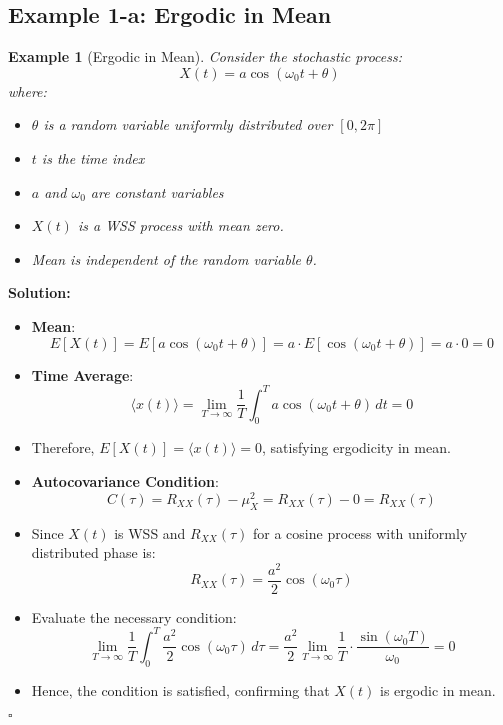 \documentclass[12pt]{article}
\newtheorem{example}{Example}
\newenvironment{solution}{\noindent\textbf{Solution:}}{\hfill$\square$}
\begin{document}
\subsection{Example 1-a: Ergodic in Mean}
\begin{example}[Ergodic in Mean]
Consider the stochastic process:
\[
X(t) = a \cos(\omega_0 t + \theta)
\]
where:
\begin{itemize}
    \item \( \theta \) is a random variable uniformly distributed over \( [0, 2\pi] \)
    \item \( t \) is the time index
    \item \( a \) and \( \omega_0 \) are constant variables
\end{itemize}
\begin{itemize}
    \item \( X(t) \) is a WSS process with mean zero.
    \item Mean is independent of the random variable \( \theta \).
\end{itemize}
\end{example}
\begin{solution}
\begin{itemize}
    \item \textbf{Mean}:
    \[
    E[X(t)] = E[a \cos(\omega_0 t + \theta)] = a \cdot E[\cos(\omega_0 t + \theta)] = a \cdot 0 = 0
    \]
    \item \textbf{Time Average}:
    \[
    \langle x(t) \rangle = \lim_{T \to \infty} \frac{1}{T} \int_{0}^{T} a \cos(\omega_0 t + \theta) \, dt = 0
    \]
    \item Therefore, \( E[X(t)] = \langle x(t) \rangle = 0 \), satisfying ergodicity in mean.
    \item \textbf{Autocovariance Condition}:
    \[
    C(\tau) = R_{XX}(\tau) - \mu_X^2 = R_{XX}(\tau) - 0 = R_{XX}(\tau)
    \]
    \item Since \( X(t) \) is WSS and \( R_{XX}(\tau) \) for a cosine process with uniformly distributed phase is:
    \[
    R_{XX}(\tau) = \frac{a^2}{2} \cos(\omega_0 \tau)
    \]
    \item Evaluate the necessary condition:
    \[
    \lim_{T \to \infty} \frac{1}{T} \int_{0}^{T} \frac{a^2}{2} \cos(\omega_0 \tau) \, d\tau = \frac{a^2}{2} \lim_{T \to \infty} \frac{1}{T} \cdot \frac{\sin(\omega_0 T)}{\omega_0} = 0
    \]
    \item Hence, the condition is satisfied, confirming that \( X(t) \) is ergodic in mean.
\end{itemize}
\end{solution}
\end{document}
